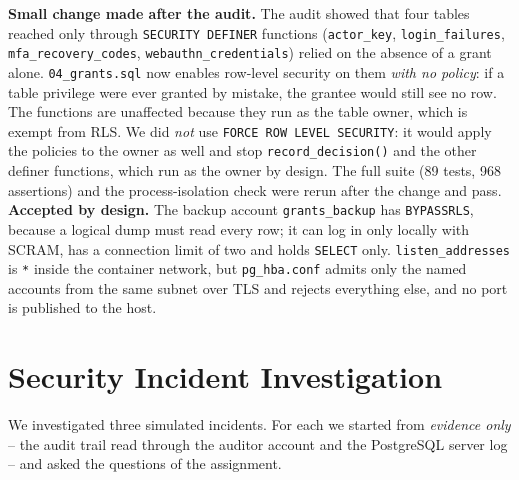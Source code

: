 \documentclass[10pt,a4paper]{article}
\newcommand{\code}[1]{\nolinkurl{#1}}
\begin{document}
\textbf{Small change made after the audit.} The audit showed that four tables reached only through \code{SECURITY DEFINER} functions (\code{actor\_key}, \code{login\_failures}, \code{mfa\_recovery\_codes}, \code{webauthn\_credentials}) relied on the absence of a grant alone. \code{04\_grants.sql} now enables row-level security on them \emph{with no policy}: if a table privilege were ever granted by mistake, the grantee would still see no row. The functions are unaffected because they run as the table owner, which is exempt from RLS. We did \emph{not} use \code{FORCE ROW LEVEL SECURITY}: it would apply the policies to the owner as well and stop \code{record\_decision()} and the other definer functions, which run as the owner by design. The full suite (89 tests, 968 assertions) and the process-isolation check were rerun after the change and pass.
\textbf{Accepted by design.} The backup account \code{grants\_backup} has \code{BYPASSRLS}, because a logical dump must read every row; it can log in only locally with SCRAM, has a connection limit of two and holds \code{SELECT} only. \code{listen\_addresses} is \code{*} inside the container network, but \code{pg\_hba.conf} admits only the named accounts from the same subnet over TLS and rejects everything else, and no port is published to the host.

\section{Security Incident Investigation}\label{sec:incident}
We investigated three simulated incidents. For each we started from \emph{evidence only} -- the audit trail read through the auditor account and the PostgreSQL server log -- and asked the questions of the assignment.
\end{document}
